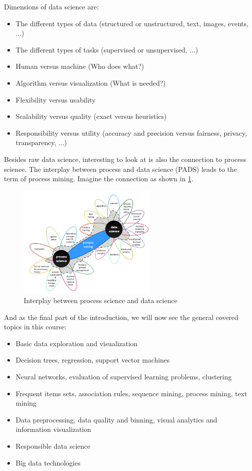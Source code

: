 Dimensions of data science are:
\begin{itemize}
  \item The different types of data (structured or unstructured, text, images, events, $\dots$)
  \item The different types of tasks (supervised or unsupervised, $\dots$)
  \item Human versus machine (Who does what?)
  \item Algorithm versus visualization (What is needed?)
  \item Flexibility versus usability
  \item Scalability versus quality (exact versus heuristics)
  \item Responsibility versus utility (accuracy and precision versus fairness, privacy, transparency, $\dots$)
\end{itemize}

Besides raw data science, interesting to look at is also the connection to process science. The interplay between process and data science (PADS) leads to the term of process mining. Imagine the connection as shown in \ref{fig:0_pads}.

\begin{figure}[H]
  \centering
  \includegraphics[width=0.6\textwidth]{assets/intro/pads.png} 
  \caption{Interplay between process science and data science}
  \label{fig:0_pads}
\end{figure}

And as the final part of the introduction, we will now see the general covered topics in this course:
\begin{itemize}
  \item Basic data exploration and visualization
  \item Decision trees, regression, support vector machines
  \item Neural networks, evaluation of supervised learning problems, clustering
  \item Frequent items sets, association rules, sequence mining, process mining, text mining
  \item Data preprocessing, data quality and binning, visual analytics and information visualization
  \item Responsible data science
  \item Big data technologies
\end{itemize}

